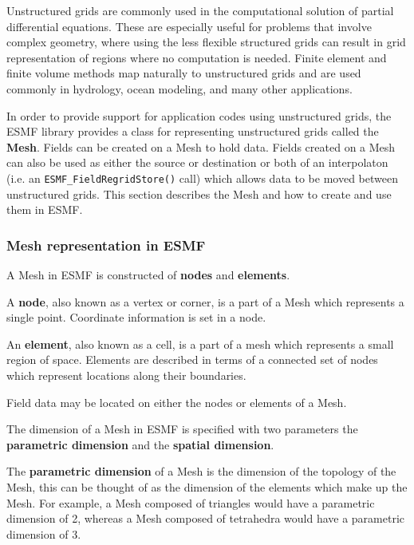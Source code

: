 
Unstructured grids are commonly used in the computational solution of partial differential 
equations.  These are especially useful for problems that involve complex geometry, where 
using the less flexible structured grids can result in grid representation of regions 
where no computation is needed.  Finite element and finite volume methods map naturally 
to unstructured grids and are used commonly in hydrology, ocean modeling, and many other 
applications.

In order to provide support for application codes using unstructured grids, the ESMF library 
provides a class for representing unstructured grids called the {\bf Mesh}. Fields can be 
created on a Mesh to hold data. Fields created on a Mesh can also be used as either the 
source or destination or both of an interpolaton (i.e. an {\tt ESMF\_FieldRegridStore()} call) 
which allows data to be moved between unstructured grids. This section describes the Mesh 
and how to create and use them in ESMF. 

\subsubsection{Mesh representation in ESMF}\label{sec:meshrep}

A Mesh in ESMF is constructed of {\bf nodes} and {\bf elements}.

A {\bf node}, also known as a vertex or corner, is a part of a Mesh which represents a single point. Coordinate information is
set in a node.

An {\bf element}, also known as a cell, is a part of a mesh which represents a small 
region of space. Elements are described in terms of a connected set of nodes which represent locations along their boundaries.

Field data may be located on either the nodes or elements of a Mesh. 

\medskip

The dimension of a Mesh in ESMF is specified with two parameters the {\bf parametric dimension} and the {\bf spatial dimension}.

The {\bf parametric dimension} of a Mesh is the dimension of the topology of the Mesh, this can be thought of as the dimension of 
the elements which make up the Mesh. For example, a Mesh composed of triangles would have a parametric dimension of 2, whereas
a Mesh composed of tetrahedra would have a parametric dimension of 3. 

